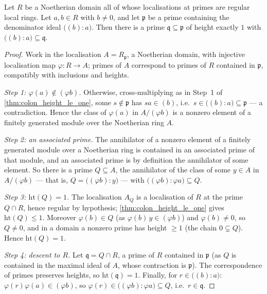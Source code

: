 \begin{theorem}
  \label{thm:pole_prime_height_one}
  \leanok
  Let \(R\) be a Noetherian domain all of whose localisations at primes are
  regular local rings. Let \(a, b \in R\) with \(b \neq 0\), and let
  \(\mathfrak p\) be a prime containing the denominator ideal
  \(\bigl((b) : a\bigr)\). Then there is a prime
  \(\mathfrak q \subseteq \mathfrak p\) of height exactly \(1\) with
  \(\bigl((b) : a\bigr) \subseteq \mathfrak q\).
\end{theorem}
\begin{proof}
  \leanok
  Work in the localisation \(A = R_{\mathfrak p}\), a Noetherian domain, with
  injective localisation map \(\varphi : R \to A\); primes of \(A\) correspond
  to primes of \(R\) contained in \(\mathfrak p\), compatibly with inclusions
  and heights.

  \emph{Step 1: \(\varphi(a) \notin (\varphi b)\).} Otherwise, cross-multiplying
  as in Step~1 of \ref{thm:colon_height_le_one}, some \(s \notin \mathfrak p\)
  has \(s a \in (b)\), i.e.\ \(s \in \bigl((b) : a\bigr) \subseteq \mathfrak p\)
  --- a contradiction. Hence the class of \(\varphi(a)\) in \(A/(\varphi b)\) is
  a nonzero element of a finitely generated module over the Noetherian ring
  \(A\).

  \emph{Step 2: an associated prime.} The annihilator of a nonzero element of a
  finitely generated module over a Noetherian ring is contained in an associated
  prime of that module, and an associated prime is by definition the annihilator
  of some element. So there is a prime \(Q \subseteq A\), the annihilator of the
  class of some \(y \in A\) in \(A/(\varphi b)\) --- that is,
  \(Q = \bigl((\varphi b) : y\bigr)\) --- with
  \(\bigl((\varphi b) : \varphi a\bigr) \subseteq Q\).

  \emph{Step 3: \(\mathrm{ht}(Q) = 1\).} The localisation \(A_Q\) is a
  localisation of \(R\) at the prime \(Q \cap R\), hence regular by hypothesis;
  \ref{thm:colon_height_le_one} gives \(\mathrm{ht}(Q) \leq 1\). Moreover
  \(\varphi(b) \in Q\) (as \(\varphi(b)\, y \in (\varphi b)\)) and
  \(\varphi(b) \neq 0\), so \(Q \neq 0\), and in a domain a nonzero prime has
  height \(\geq 1\) (the chain \(0 \subsetneq Q\)). Hence
  \(\mathrm{ht}(Q) = 1\).

  \emph{Step 4: descent to \(R\).} Let \(\mathfrak q = Q \cap R\), a prime of
  \(R\) contained in \(\mathfrak p\) (as \(Q\) is contained in the maximal ideal
  of \(A\), whose contraction is \(\mathfrak p\)). The correspondence of primes
  preserves heights, so \(\mathrm{ht}(\mathfrak q) = 1\). Finally, for
  \(r \in \bigl((b) : a\bigr)\): \(\varphi(r)\varphi(a) \in (\varphi b)\), so
  \(\varphi(r) \in \bigl((\varphi b) : \varphi a\bigr) \subseteq Q\), i.e.\
  \(r \in \mathfrak q\).
\end{proof}

